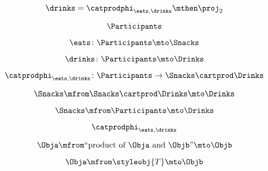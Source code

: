 {\begin{forslides}
        \begin{equation}
            \label{eq:feedback-050}
            \drinks=\catprodphi_{\eats,\drinks}\mthen \proj_2
        \end{equation}

        \begin{equation}
            \label{eq:feedback-051}
            \Participants
        \end{equation}

        \begin{equation}
            \label{eq:feedback-052}
            \eats\colon \Participants \mto \Snacks
        \end{equation}

        \begin{equation}
            \label{eq:feedback-053}
            \drinks\colon \Participants \mto \Drinks
        \end{equation}

        \begin{equation}
            \label{eq:feedback-054}
            \catprodphi_{\eats,\drinks} \colon \Participants \to \Snacks \cartprod \Drinks
        \end{equation}

        \begin{equation}
            \label{eq:feedback-055}
            \Snacks \mfrom \Snacks \cartprod \Drinks \mto \Drinks
        \end{equation}

        \begin{equation}
            \label{eq:feedback-056}
            \Snacks \mfrom  \Participants \mto \Drinks
        \end{equation}

        \begin{equation}
            \label{eq:feedback-057}
            \catprodphi_{\eats,\drinks}
        \end{equation}

        \begin{equation}
            \label{eq:feedback-058}
            \Obja \mfrom \text{``product of } \Obja \text{ and } \Objb \text{''}  \mto \Objb
        \end{equation}

        \begin{equation}
            \label{eq:feedback-059}
            \Obja \mfrom \styleobj{T} \mto \Objb
        \end{equation}


\end{forslides}}
